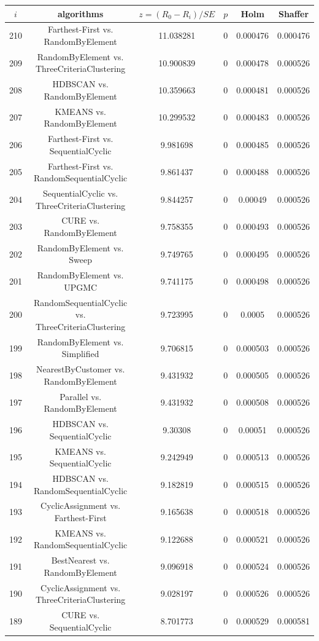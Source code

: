 \documentclass[a4paper,10pt]{article}
\begin{document}
\begin{landscape}
\begin{table}[!htp]
\centering\scriptsize
\begin{tabular}{cccccc}
$i$&algorithms&$z=(R_0 - R_i)/SE$&$p$&Holm&Shaffer\\
\hline210&Farthest-First vs. RandomByElement&11.038281&0&0.000476&0.000476\\
209&RandomByElement vs. ThreeCriteriaClustering&10.900839&0&0.000478&0.000526\\
208&HDBSCAN vs. RandomByElement&10.359663&0&0.000481&0.000526\\
207&KMEANS vs. RandomByElement&10.299532&0&0.000483&0.000526\\
206&Farthest-First vs. SequentialCyclic&9.981698&0&0.000485&0.000526\\
205&Farthest-First vs. RandomSequentialCyclic&9.861437&0&0.000488&0.000526\\
204&SequentialCyclic vs. ThreeCriteriaClustering&9.844257&0&0.00049&0.000526\\
203&CURE vs. RandomByElement&9.758355&0&0.000493&0.000526\\
202&RandomByElement vs. Sweep&9.749765&0&0.000495&0.000526\\
201&RandomByElement vs. UPGMC&9.741175&0&0.000498&0.000526\\
200&RandomSequentialCyclic vs. ThreeCriteriaClustering&9.723995&0&0.0005&0.000526\\
199&RandomByElement vs. Simplified&9.706815&0&0.000503&0.000526\\
198&NearestByCustomer vs. RandomByElement&9.431932&0&0.000505&0.000526\\
197&Parallel vs. RandomByElement&9.431932&0&0.000508&0.000526\\
196&HDBSCAN vs. SequentialCyclic&9.30308&0&0.00051&0.000526\\
195&KMEANS vs. SequentialCyclic&9.242949&0&0.000513&0.000526\\
194&HDBSCAN vs. RandomSequentialCyclic&9.182819&0&0.000515&0.000526\\
193&CyclicAssignment vs. Farthest-First&9.165638&0&0.000518&0.000526\\
192&KMEANS vs. RandomSequentialCyclic&9.122688&0&0.000521&0.000526\\
191&BestNearest vs. RandomByElement&9.096918&0&0.000524&0.000526\\
190&CyclicAssignment vs. ThreeCriteriaClustering&9.028197&0&0.000526&0.000526\\
189&CURE vs. SequentialCyclic&8.701773&0&0.000529&0.000581\\

\end{tabular}
\end{table}
\end{landscape}
\end{document}
